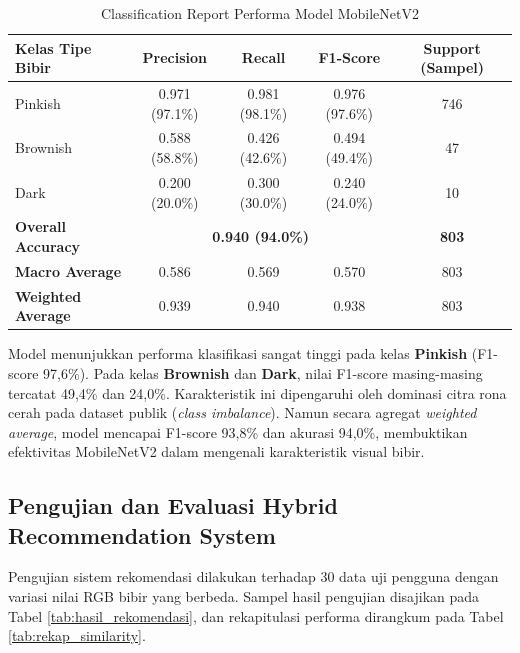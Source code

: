 \documentclass[10pt,a4paper]{article}
\begin{document}
\begin{table}[htbp]
  \centering
  \caption{Classification Report Performa Model MobileNetV2}
  \label{tab:classification_report}
  \fontsize{8.5pt}{11pt}\selectfont
  \begin{tabular}{lcccc}
    \toprule
    \textbf{Kelas Tipe Bibir} & \textbf{Precision} & \textbf{Recall} & \textbf{F1-Score} & \textbf{Support (Sampel)} \\
    \midrule
    Pinkish      & 0.971 (97.1\%) & 0.981 (98.1\%) & 0.976 (97.6\%) & 746 \\
    Brownish     & 0.588 (58.8\%) & 0.426 (42.6\%) & 0.494 (49.4\%) & 47  \\
    Dark         & 0.200 (20.0\%) & 0.300 (30.0\%) & 0.240 (24.0\%) & 10  \\
    \midrule
    \textbf{Overall Accuracy} & \multicolumn{3}{c}{\textbf{0.940 (94.0\%)}} & \textbf{803} \\
    \textbf{Macro Average}    & 0.586 & 0.569 & 0.570 & 803 \\
    \textbf{Weighted Average} & 0.939 & 0.940 & 0.938 & 803 \\
    \bottomrule
  \end{tabular}
\end{table}

Model menunjukkan performa klasifikasi sangat tinggi pada kelas \textbf{Pinkish} (F1-score 97,6\%). Pada kelas \textbf{Brownish} dan \textbf{Dark}, nilai F1-score masing-masing tercatat 49,4\% dan 24,0\%. Karakteristik ini dipengaruhi oleh dominasi citra rona cerah pada dataset publik (\textit{class imbalance}). Namun secara agregat \textit{weighted average}, model mencapai F1-score 93,8\% dan akurasi 94,0\%, membuktikan efektivitas MobileNetV2 dalam mengenali karakteristik visual bibir.

\subsection{Pengujian dan Evaluasi Hybrid Recommendation System}
Pengujian sistem rekomendasi dilakukan terhadap 30 data uji pengguna dengan variasi nilai RGB bibir yang berbeda. Sampel hasil pengujian disajikan pada Tabel \ref{tab:hasil_rekomendasi}, dan rekapitulasi performa dirangkum pada Tabel \ref{tab:rekap_similarity}.
\end{document}
